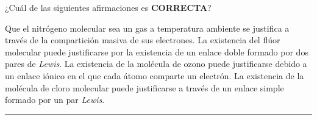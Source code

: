 \documentclass[a4paper,addpoints,14pt]{exam}
\newcommand*\chem[1]{\ensuremath{\mathrm{#1}}}
\newcommand{\halmos}{\vspace*{-4mm}
	
					\begin{flushright}
						\rule{1mm}{2.5mm} 
					\end{flushright}\vspace*{-4mm}
						
					  }
\renewcommand{\qed}{\halmos}
\begin{document}
\begin{questions}
	
		
%
%	
%	

	
	\begin{question}[1] ¿Cuál de las siguientes afirmaciones es \textbf{\small{CORRECTA}}?
		\begin{checkboxes}
			\choice Que el nitrógeno molecular sea un gas a temperatura ambiente se justifica a través de la 									compartición masiva de sus electrones.			
			\choice La existencia del flúor molecular puede justificarse por la existencia de un enlace doble formado 						por dos pares de \textit{Lewis}.		
			\choice La existencia de la molécula de ozono puede justificarse debido a un enlace iónico en el que 						cada átomo comparte un electrón.
			\CorrectChoice La existencia de la molécula de cloro molecular puede justificarse a través de un enlace simple formado por un par \textit{Lewis}.
		\end{checkboxes}	
	\end{question}
	\qed
\vspace{-1ex}
		


\end{questions}
\end{document}
